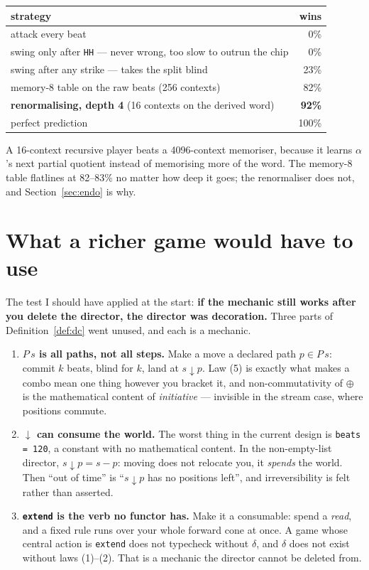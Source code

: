 \documentclass[11pt,a4paper]{article}
\theoremstyle{definition}
\theoremstyle{plain}
\theoremstyle{remark}
\begin{document}
\begin{center}
\begin{tabular}{lr}
\toprule
strategy & wins \\
\midrule
attack every beat & \phantom{00}0\% \\
swing only after \texttt{HH} --- never wrong, too slow to outrun the chip & \phantom{00}0\% \\
swing after any strike --- takes the split blind & \phantom{0}23\% \\
memory-8 table on the raw beats (256 contexts) & \phantom{0}82\% \\
\textbf{renormalising, depth 4} (16 contexts on the derived word) & \textbf{92\%} \\
perfect prediction & 100\% \\
\bottomrule
\end{tabular}
\end{center}

A 16-context recursive player beats a 4096-context memoriser, because it learns
$\alpha$'s next partial quotient instead of memorising more of the word. The
memory-8 table flatlines at 82--83\% no matter how deep it goes; the
renormaliser does not, and Section~\ref{sec:endo} is why.

\section{What a richer game would have to use}

The test I should have applied at the start: \textbf{if the mechanic still works
after you delete the director, the director was decoration.} Three parts of
Definition~\ref{def:dc} went unused, and each is a mechanic.

\begin{enumerate}\itemsep4pt
\item \textbf{$P\,s$ is all paths, not all steps.} Make a move a declared path
      $p \in P\,s$: commit $k$ beats, blind for $k$, land at $s \downarrow p$.
      Law (5) is exactly what makes a combo mean one thing however you bracket
      it, and non-commutativity of $\oplus$ is the mathematical content of
      \emph{initiative} --- invisible in the stream case, where positions
      commute.
\item \textbf{$\downarrow$ can consume the world.} The worst thing in the
      current design is \texttt{beats = 120}, a constant with no mathematical
      content. In the non-empty-list director, $s \downarrow p = s - p$: moving
      does not relocate you, it \emph{spends} the world. Then ``out of time'' is
      ``$s \downarrow p$ has no positions left'', and irreversibility is felt
      rather than asserted.
\item \textbf{\texttt{extend} is the verb no functor has.} Make it a
      consumable: spend a \emph{read}, and a fixed rule runs over your whole
      forward cone at once. A game whose central action is \texttt{extend} does
      not typecheck without $\delta$, and $\delta$ does not exist without laws
      (1)--(2). That is a mechanic the director cannot be deleted from.
\end{enumerate}
\end{document}
